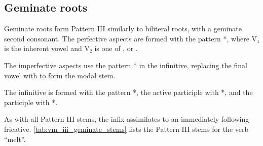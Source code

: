 \documentclass[grammar]{subfiles}
\begin{document}
\subsection{Geminate roots}
\label{ssec:vm_iii_geminate_roots}

Geminate roots form Pattern III similarly to biliteral roots, with a geminate
second consonant.  The perfective aspects are formed with the pattern
*, where V₁ is the inherent vowel and V₂ is one of ,
 or .  

The imperfective aspects use the pattern * in the infinitive,
replacing the final vowel with  to form the modal stem. 

The infinitive is formed with the pattern *, the active participle
with *, and the participle with *.  

As with all Pattern III stems, the infix  assimilates to an immediately
following fricative.  \cref{tab:vm_iii_geminate_stems} lists the Pattern III stems for
the verb  “melt”.

\begin{table}[h!]\small\capstart
  \centering
  \\
  \caption{Pattern III geminate stems \label{tab:vm_iii_geminate_stems}}
\end{table}
\end{document}
